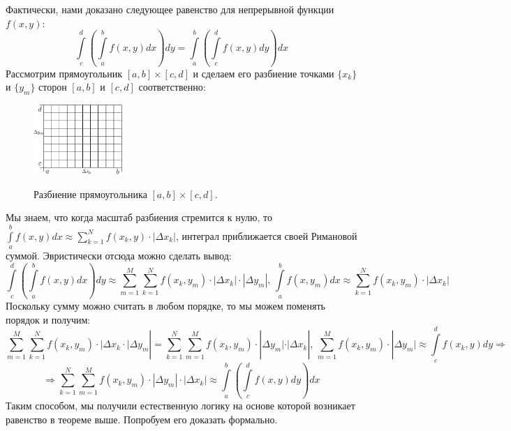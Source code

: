 \documentclass[12pt]{article}
\theoremstyle{definition}
\newcommand{\ddsum}[2]{\displaystyle\sum\limits_{#1}^{#2}}
\newcommand{\ddint}[2]{\displaystyle\int\limits_{#1}^{#2}}
\begin{document}
Фактически, нами доказано следующее равенство для непрерывной функции $f(x,y)$:
$$
	\ddint{c}{d}\left(\ddint{a}{b}f(x,y)dx\right)dy = \ddint{a}{b}\left(\ddint{c}{d}f(x,y)dy\right)dx
$$
Рассмотрим прямоугольник $[a,b]\times[c,d]$ и сделаем его разбиение точками $\{x_k\}$ и $\{y_m\}$ сторон $[a,b]$ и $[c,d]$ соответственно:
\begin{figure}[H]
	\centering
	\includegraphics[width=0.3\textwidth]{MA3L22_1.eps}
	\label{MA3L22_1}
	\caption{Разбиение прямоугольника $[a,b]\times [c,d]$.}
	\label{fig:прямоугольник с повторными интегралами}
\end{figure}
Мы знаем, что когда масштаб разбиения стремится к нулю, то $\ddint{a}{b}f(x,y)dx \approx \ddsum{k = 1}{N}f(x_k, y){\cdot}|\Delta x_k|$, интеграл приближается своей Римановой суммой. Эвристически отсюда можно сделать вывод:
$$
	\ddint{c}{d}\left(\ddint{a}{b}f(x,y)dx\right)dy \approx \ddsum{m = 1}{M}\ddsum{k = 1}{N}f(x_k, y_m){\cdot}|\Delta x_k| {\cdot}|\Delta y_m|, \, \ddint{a}{b}f(x,y_m)dx \approx \ddsum{k = 1}{N}f(x_k, y_m){\cdot}|\Delta x_k|
$$
Поскольку сумму можно считать в любом порядке, то мы можем поменять порядок и получим:
$$
	\ddsum{m = 1}{M}\ddsum{k = 1}{N}f(x_k, y_m){\cdot}|\Delta x_k{\cdot}|\Delta y_m| = \ddsum{k = 1}{N}\ddsum{m = 1}{M}f(x_k, y_m) {\cdot}|\Delta y_m|{\cdot}|\Delta x_k|, \, \ddsum{m = 1}{M}f(x_k, y_m) {\cdot}|\Delta y_m| \approx \ddint{c}{d}f(x_k,y)dy \Rightarrow
$$
$$
	\Rightarrow \ddsum{k = 1}{N}\ddsum{m = 1}{M}f(x_k, y_m){\cdot} |\Delta y_m|{\cdot}|\Delta x_k| \approx \ddint{a}{b}\left(\ddint{c}{d}f(x,y)dy\right)dx
$$
Таким способом, мы получили естественную логику на основе которой возникает равенство в теореме выше. Попробуем его доказать формально.
\end{document}
